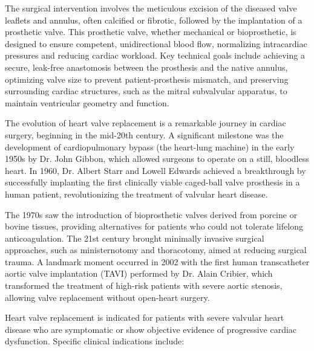 The surgical intervention involves the meticulous excision of the diseased valve leaflets and annulus, often calcified or fibrotic, followed by the implantation of a prosthetic valve. This prosthetic valve, whether mechanical or bioprosthetic, is designed to ensure competent, unidirectional blood flow, normalizing intracardiac pressures and reducing cardiac workload. Key technical goals include achieving a secure, leak-free anastomosis between the prosthesis and the native annulus, optimizing valve size to prevent patient-prosthesis mismatch, and preserving surrounding cardiac structures, such as the mitral subvalvular apparatus, to maintain ventricular geometry and function.

The evolution of heart valve replacement is a remarkable journey in cardiac surgery, beginning in the mid-20th century. A significant milestone was the development of cardiopulmonary bypass (the heart-lung machine) in the early 1950s by Dr. John Gibbon, which allowed surgeons to operate on a still, bloodless heart. In 1960, Dr. Albert Starr and Lowell Edwards achieved a breakthrough by successfully implanting the first clinically viable caged-ball valve prosthesis in a human patient, revolutionizing the treatment of valvular heart disease.

The 1970s saw the introduction of bioprosthetic valves derived from porcine or bovine tissues, providing alternatives for patients who could not tolerate lifelong anticoagulation. The 21st century brought minimally invasive surgical approaches, such as ministernotomy and thoracotomy, aimed at reducing surgical trauma. A landmark moment occurred in 2002 with the first human transcatheter aortic valve implantation (TAVI) performed by Dr. Alain Cribier, which transformed the treatment of high-risk patients with severe aortic stenosis, allowing valve replacement without open-heart surgery.

Heart valve replacement is indicated for patients with severe valvular heart disease who are symptomatic or show objective evidence of progressive cardiac dysfunction. Specific clinical indications include:

